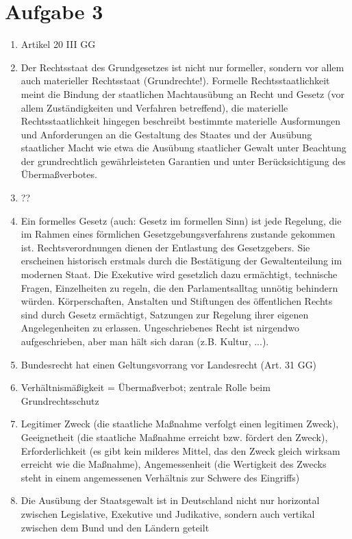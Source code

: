 \documentclass{article}
\begin{document}
	\section*{Aufgabe 3}
	\begin{enumerate}[label=(\alph*)]
		\item Artikel 20 III GG
		\item Der Rechtsstaat des Grundgesetzes ist nicht nur formeller, sondern vor allem auch materieller Rechts\-staat (Grundrechte!). Formelle Rechtsstaatlichkeit meint die Bindung der staatlichen Machtausübung an Recht und Gesetz (vor allem Zuständigkeiten und Verfahren betreffend), die materielle Rechtsstaatl\-ichkeit hingegen beschreibt bestimmte materielle Ausformungen und Anforderungen an die Gestaltung des Staates und der Ausübung staatlicher Macht wie etwa die Ausübung staatlicher Gewalt unter Beachtung der grundrechtlich gewährleisteten Garantien und unter Berücksichtigung des Übermaßver\-botes. 
		\item ??
		\item Ein formelles Gesetz (auch: Gesetz im formellen Sinn) ist jede Regelung, die im Rahmen eines förmlichen Gesetzgebungsverfahrens zustande gekommen ist. Rechtsverordnungen dienen der Entlastung des Gesetzgebers. Sie erscheinen historisch erstmals durch die Bestätigung der Gewaltenteilung im modernen Staat. Die Exekutive wird gesetzlich dazu ermächtigt, technische Fragen, Einzelheiten zu regeln, die den Parlamentsalltag unnötig behindern würden. Körperschaften, Anstalten und Stiftungen des öffentlichen Rechts sind durch Gesetz ermächtigt, Satzungen zur Regelung ihrer eigenen Angelegenheiten zu erlassen. Ungeschriebenes Recht ist nirgendwo aufgeschrieben, aber man hält sich daran (z.B. Kultur, ...).
		\item Bundesrecht hat einen Geltungsvorrang vor Landesrecht (Art. 31 GG)
		\item Verhältnismäßigkeit = Übermaßverbot; zentrale Rolle beim Grundrechtsschutz
		\item Legitimer Zweck (die staatliche Maßnahme verfolgt einen legitimen Zweck), Geeignetheit (die staatliche Maßnahme erreicht bzw. fördert den Zweck), Erforderlichkeit (es gibt kein milderes Mittel, das den Zweck gleich wirksam erreicht wie die Maßnahme), Angemessenheit (die Wertigkeit des Zwecks steht in einem angemessenen Verhältnis zur Schwere des Eingriffs)
		\item Die Ausübung der Staatsgewalt ist in Deutschland nicht nur horizontal zwischen Legislative, Exekutive und Judikative, sondern auch vertikal zwischen dem Bund und den Ländern geteilt

\end{enumerate}
\end{document}
